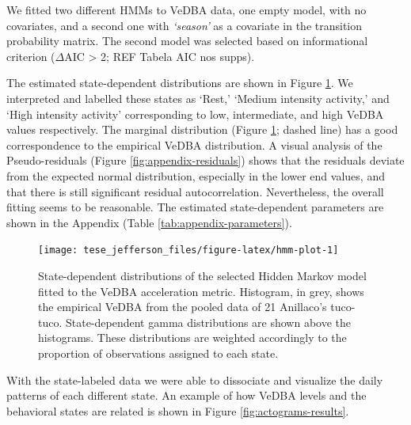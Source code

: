 \documentclass[msc,numbers,hidelinks]{coppe}
\begin{document}
  We fitted two different HMMs to VeDBA data, one empty model, with no covariates, and a second one with \emph{`season'} as a covariate in the transition probability matrix. The second model was selected based on informational criterion (\(\Delta\)AIC \textgreater{} 2; REF Tabela AIC nos supps).

  The estimated state-dependent distributions are shown in Figure \ref{fig:hmm-plot}. We interpreted and labelled these states as `Rest,' `Medium intensity activity,' and `High intensity activity' corresponding to low, intermediate, and high VeDBA values respectively. The marginal distribution (Figure \ref{fig:hmm-plot}; dashed line) has a good correspondence to the empirical VeDBA distribution. A visual analysis of the Pseudo-residuals (Figure \ref{fig:appendix-residuals}) shows that the residuals deviate from the expected normal distribution, especially in the lower end values, and that there is still significant residual autocorrelation. Nevertheless, the overall fitting seems to be reasonable. The estimated state-dependent parameters are shown in the Appendix (Table \ref{tab:appendix-parameters}). \newline
  \begin{figure}[H]

  {\centering \texttt{[image: tese\_jefferson\_files/figure-latex/hmm-plot-1]} 

  }

  \caption{State-dependent distributions of the selected Hidden Markov model fitted to the VeDBA acceleration metric. Histogram, in grey, shows the empirical VeDBA from the pooled data of 21 Anillaco's tuco-tuco. State-dependent gamma distributions are shown above the histograms. These distributions are weighted accordingly to the proportion of observations assigned to each state.}\label{fig:hmm-plot}
  \end{figure}
  With the state-labeled data we were able to dissociate and visualize the daily patterns of each different state. An example of how VeDBA levels and the behavioral states are related is shown in Figure \ref{fig:actograms-results}.
\end{document}
